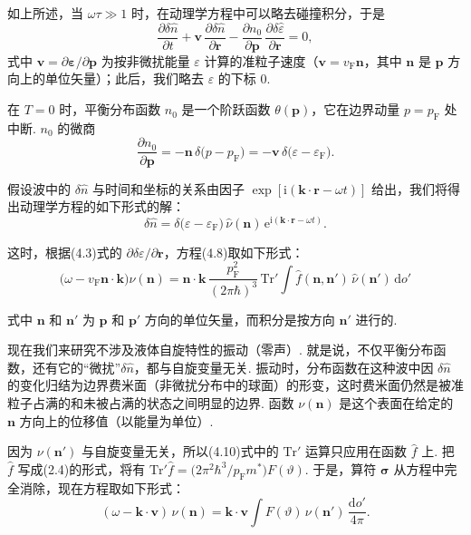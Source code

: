 如上所述，当 $\omega\tau\gg1$ 时，在动理学方程中可以略去碰撞积分，于是
\begin{equation}
\frac{\partial\delta\hat n}{\partial t}
+\bm v\,\frac{\partial\delta\hat n}{\partial\bm r}
-\frac{\partial n_{0}}{\partial\bm p}\,\frac{\partial\delta\hat\varepsilon}{\partial\bm r}=0,
\end{equation}
式中 $\bm v=\partial\bm\varepsilon/\partial\bm p$ 为按非微扰能量 $\varepsilon$ 计算的准粒子速度（$\bm v=v_{\mathrm F}\bm n$，其中 $\bm n$ 是 $\bm p$ 方向上的单位矢量）；此后，我们略去 $\varepsilon$ 的下标 0.

在 $T=0$ 时，平衡分布函数 $n_{0}$ 是一个阶跃函数 $\theta(\bm p)$，它在边界动量 $p=p_{\mathrm F}$ 处中断. $n_{0}$ 的微商
\begin{equation*}
\frac{\partial n_{0}}{\partial\bm p}
=-\bm n\,\delta\bigl(p-p_{\mathrm F}\bigr)
=-\bm v\,\delta\bigl(\varepsilon-\varepsilon_{\mathrm F}\bigr).
\end{equation*}

假设波中的 $\delta\hat n$ 与时间和坐标的关系由因子 $\exp[\mathrm{i}(\bm k\cdot\bm r-\omega t)]$ 给出，我们将得出动理学方程的如下形式的解：
\begin{equation}
\delta\hat n=\delta\bigl(\varepsilon-\varepsilon_{\mathrm F}\bigr)\,\hat\nu(\bm n)\,\mathrm{e}^{\mathrm{i}(\bm k\cdot\bm r-\omega t)}.
\end{equation}

这时，根据(4.3)式的 $\partial\delta\varepsilon/\partial\bm r$，方程(4.8)取如下形式：
\begin{equation}
\bigl(\omega-v_{\mathrm F}\bm n\cdot\bm k\bigr)\hat\nu(\bm n)
=\bm n\cdot\bm k\,\frac{p_{\mathrm F}^{2}}{(2\pi\hbar)^{3}}\,\mathrm{Tr}'\int\hat f(\bm n,\bm n')\,\hat\nu(\bm n')\,\mathrm{d}o'
\end{equation}

式中 $\bm n$ 和 $\bm n'$ 为 $\bm p$ 和 $\bm p'$ 方向的单位矢量，而积分是按方向 $\bm n'$ 进行的.

现在我们来研究不涉及液体自旋特性的振动（零声）. 就是说，不仅平衡分布函数，还有它的“微扰”$\delta\hat n$，都与自旋变量无关. 振动时，分布函数在这种波中因 $\delta\hat n$ 的变化归结为边界费米面（非微扰分布中的球面）的形变，这时费米面仍然是被准粒子占满的和未被占满的状态之间明显的边界. 函数 $\nu(\bm n)$ 是这个表面在给定的 $\bm n$ 方向上的位移值（以能量为单位）.

因为 $\nu(\bm n')$ 与自旋变量无关，所以(4.10)式中的 $\mathrm{Tr}'$ 运算只应用在函数 $\hat f$ 上. 把 $\hat f$ 写成(2.4)的形式，将有 $\mathrm{Tr}'\hat f=\bigl(2\pi^{2}\hbar^{3}/p_{\mathrm F}m^{*}\bigr)F(\vartheta)$. 于是，算符 $\bm\sigma$ 从方程中完全消除，现在方程取如下形式：
\begin{equation}
(\omega-\bm k\cdot\bm v)\,\nu(\bm n)=\bm k\cdot\bm v\int F(\vartheta)\,\nu(\bm n')\,\frac{\mathrm{d}o'}{4\pi}.
\end{equation}

